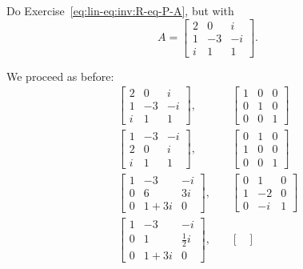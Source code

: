  Do Exercise~\ref{eq:lin-eq:inv:R-eq-P-A}, but with
\begin{equation*}
  A =
  \begin{bmatrix}
    2 & 0 & i \\
    1 & -3 & -i \\
    i & 1 & 1
  \end{bmatrix}.
\end{equation*}
\begin{solution}
  We proceed as before:
  \begin{align*}
    \begin{bmatrix}
      2 & 0 & i \\
      1 & -3 & -i \\
      i & 1 & 1
    \end{bmatrix},
    &\quad
    \begin{bmatrix}
      1 & 0 & 0 \\
      0 & 1 & 0 \\
      0 & 0 & 1
    \end{bmatrix} \\
    \begin{bmatrix}
      1 & -3 & -i \\
      2 & 0 & i \\
      i & 1 & 1
    \end{bmatrix},
    &\quad
    \begin{bmatrix}
      0 & 1 & 0 \\
      1 & 0 & 0 \\
      0 & 0 & 1
    \end{bmatrix} \\
    \begin{bmatrix}
      1 & -3 & -i \\
      0 & 6 & 3i \\
      0 & 1 + 3i & 0
    \end{bmatrix},
    &\quad
    \begin{bmatrix}
      0 & 1 & 0 \\
      1 & -2 & 0 \\
      0 & -i & 1
    \end{bmatrix} \\
    \begin{bmatrix}
      1 & -3 & -i \\[3pt]
      0 & 1 & \frac12i \\[3pt]
      0 & 1 + 3i & 0
    \end{bmatrix},
    &\quad
    \begin{bmatrix}

\end{bmatrix}
\end{align*}
\end{solution}
